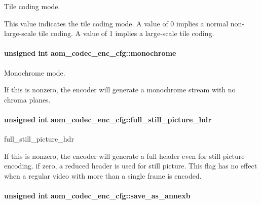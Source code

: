 Tile coding mode. 

This value indicates the tile coding mode. A value of 0 implies a normal non-\/large-\/scale tile coding. A value of 1 implies a large-\/scale tile coding. 
\paragraph[{\texorpdfstring{monochrome}{monochrome}}]{\setlength{\rightskip}{0pt plus 5cm}unsigned int aom\+\_\+codec\+\_\+enc\+\_\+cfg\+::monochrome}\hypertarget{structaom__codec__enc__cfg_a71d97f2a1ff3850955c50705104ac54a}{}\label{structaom__codec__enc__cfg_a71d97f2a1ff3850955c50705104ac54a}


Monochrome mode. 

If this is nonzero, the encoder will generate a monochrome stream with no chroma planes. 
\paragraph[{\texorpdfstring{full\+\_\+still\+\_\+picture\+\_\+hdr}{full_still_picture_hdr}}]{\setlength{\rightskip}{0pt plus 5cm}unsigned int aom\+\_\+codec\+\_\+enc\+\_\+cfg\+::full\+\_\+still\+\_\+picture\+\_\+hdr}\hypertarget{structaom__codec__enc__cfg_a35b8433fa60af32d0aecc2b56e736a98}{}\label{structaom__codec__enc__cfg_a35b8433fa60af32d0aecc2b56e736a98}


full\+\_\+still\+\_\+picture\+\_\+hdr 

If this is nonzero, the encoder will generate a full header even for still picture encoding. if zero, a reduced header is used for still picture. This flag has no effect when a regular video with more than a single frame is encoded. 
\paragraph[{\texorpdfstring{save\+\_\+as\+\_\+annexb}{save_as_annexb}}]{\setlength{\rightskip}{0pt plus 5cm}unsigned int aom\+\_\+codec\+\_\+enc\+\_\+cfg\+::save\+\_\+as\+\_\+annexb}\hypertarget{structaom__codec__enc__cfg_adb3fe41c1ce39579a49b97bc2ca7b2f2}{}\label{structaom__codec__enc__cfg_adb3fe41c1ce39579a49b97bc2ca7b2f2}


